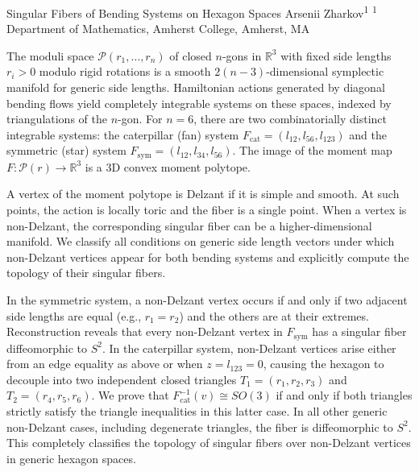 \makeabstractSHORT
{ %
Singular Fibers of Bending Systems on Hexagon Spaces
}
{ %
Arsenii Zharkov\textsuperscript{1}
}
{ %
\textsuperscript{1} Department of Mathematics, Amherst College, Amherst, MA
}
{ %
The moduli space $\mathcal P(r_1,\dots,r_n)$ of closed $n$-gons in $\mathbb R^3$ with fixed side lengths $r_i>0$ modulo rigid rotations is a smooth $2(n-3)$-dimensional symplectic manifold for generic side lengths. Hamiltonian actions generated by diagonal bending flows yield completely integrable systems on these spaces, indexed by triangulations of the $n$-gon. For $n=6$, there are two combinatorially distinct integrable systems: the caterpillar (fan) system $F_{\text{cat}} = (l_{12}, l_{56}, l_{123})$ and the symmetric (star) system $F_{\text{sym}} = (l_{12}, l_{34}, l_{56})$. The image of the moment map $F: \mathcal{P}(r) \to \mathbb{R}^3$ is a 3D convex moment polytope.

A vertex of the moment polytope is Delzant if it is simple and smooth. At such points, the action is locally toric and the fiber is a single point. When a vertex is non-Delzant, the corresponding singular fiber can be a higher-dimensional manifold. We classify all conditions on generic side length vectors under which non-Delzant vertices appear for both bending systems and explicitly compute the topology of their singular fibers.

In the symmetric system, a non-Delzant vertex occurs if and only if two adjacent side lengths are equal (e.g., $r_1 = r_2$) and the others are at their extremes. Reconstruction reveals that every non-Delzant vertex in $F_{\text{sym}}$ has a singular fiber diffeomorphic to $S^2$. In the caterpillar system, non-Delzant vertices arise either from an edge equality as above or when $z = l_{123} = 0$, causing the hexagon to decouple into two independent closed triangles $T_1 = (r_1,r_2,r_3)$ and $T_2 = (r_4,r_5,r_6)$. We prove that $F_{\text{cat}}^{-1}(v) \cong SO(3)$ if and only if both triangles strictly satisfy the triangle inequalities in this latter case. In all other generic non-Delzant cases, including degenerate triangles, the fiber is diffeomorphic to $S^2$. This completely classifies the topology of singular fibers over non-Delzant vertices in generic hexagon spaces.
}
 \newpage